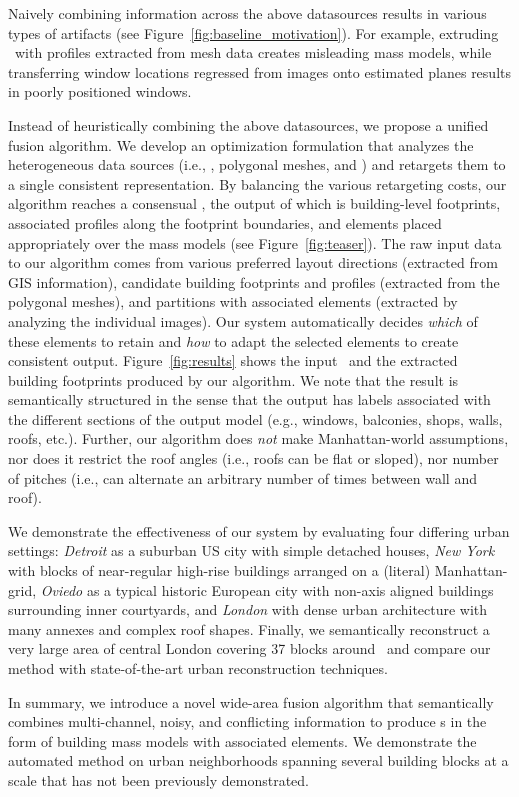 Naively combining information across the above datasources results in various types of artifacts (see Figure~\ref{fig:baseline_motivation}). For example, extruding \GISds\ with profiles extracted from mesh data creates misleading mass models, while transferring window locations regressed from images onto estimated \facade planes results in poorly positioned windows.
%

Instead of heuristically combining the above datasources, we propose a unified fusion algorithm. 
%
We develop an optimization formulation that analyzes the heterogeneous data sources (i.e., \GISds, polygonal meshes, and \streetI) and retargets them to a single consistent representation. By balancing the various retargeting costs, our algorithm reaches a consensual {\em \outputM}, the output of which is building-level footprints, associated profiles along the footprint boundaries, and \facade elements placed appropriately over the  mass models (see Figure~\ref{fig:teaser}). The raw input data to our algorithm comes from various preferred layout directions (extracted from GIS information), candidate building footprints and profiles (extracted from the polygonal meshes), and \facade partitions with associated elements (extracted by analyzing the individual \facade images). Our system automatically decides {\em which} of these elements to retain and {\em how} to adapt the selected elements to create consistent output. 
%
Figure~\ref{fig:results} shows the input \GISds\ and the extracted building footprints produced by our algorithm. We note that the result is semantically structured in the sense that the output has labels associated with the different sections of the output model (e.g., windows, balconies, shops, walls, roofs, etc.).
%
Further, our algorithm does {\em not} make Manhattan-world assumptions, nor does it restrict the roof angles (i.e., roofs can be flat or sloped), nor number of pitches (i.e., \facades can alternate an arbitrary number of times between wall and roof). 

We demonstrate the effectiveness of our system by evaluating four differing urban settings: {\em Detroit} as a suburban US city with simple detached houses, {\em New York} with blocks of near-regular high-rise buildings arranged on a (literal) Manhattan-grid, {\em Oviedo} as a typical historic European city with non-axis aligned buildings surrounding inner courtyards, and 
{\em London} with dense urban architecture with many annexes and complex roof shapes.
%
Finally, we semantically reconstruct a very large area of central London covering 37 blocks around \LondonOC\ and compare our method with state-of-the-art urban reconstruction techniques.


In summary, we introduce a novel wide-area fusion algorithm that semantically combines multi-channel, noisy, and conflicting information to produce {\outputM}s in the form of building mass models with associated \facade elements. We demonstrate the automated method on urban neighborhoods spanning several building blocks at a scale that has not been previously demonstrated.
